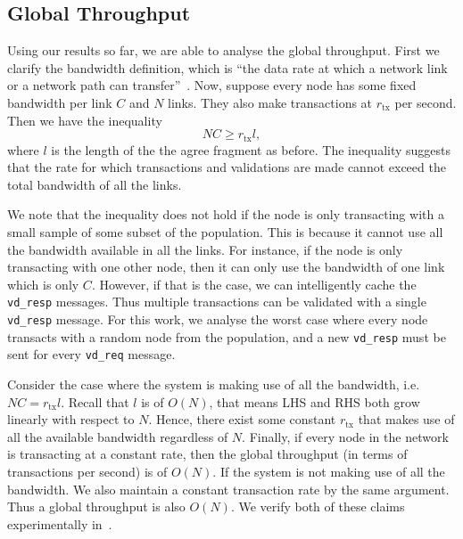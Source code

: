 \subsection{Global Throughput}
\label{sec:global-throughput}
Using our results so far, we are able to analyse the global throughput.
First we clarify the bandwidth definition, which is ``the data rate at which a network link or a network path can transfer''~\cite{prasad2003bandwidth}.
Now, suppose every node has some fixed bandwidth per link $C$ and $N$ links.
They also make transactions at $r_{\text{tx}}$ per second.
Then we have the inequality
$$NC \ge r_{\text{tx}} l,$$
where $l$ is the length of the the agree fragment as before.
The inequality suggests that the rate for which transactions and validations are made cannot exceed the total bandwidth of all the links.

We note that the inequality does not hold if the node is only transacting with a small sample of some subset of the population.
This is because it cannot use all the bandwidth available in all the links.
For instance, if the node is only transacting with one other node, then it can only use the bandwidth of one link which is only $C$.
However, if that is the case, we can intelligently cache the \texttt{vd\_resp} messages.
Thus multiple transactions can be validated with a single \texttt{vd\_resp} message.
For this work, we analyse the worst case where every node transacts with a random node from the population,
and a new \texttt{vd\_resp} must be sent for every \texttt{vd\_req} message.

Consider the case where the system is making use of all the bandwidth, i.e. $NC = r_{\text{tx}} l$.
Recall that $l$ is of $O(N)$, that means LHS and RHS both grow linearly with respect to $N$.
Hence, there exist some constant $r_\text{tx}$ that makes use of all the available bandwidth regardless of $N$.
Finally, if every node in the network is transacting at a constant rate, then the global throughput (in terms of transactions per second) is of $O(N)$.
If the system is not making use of all the bandwidth.
We also maintain a constant transaction rate by the same argument.
Thus a global throughput is also $O(N)$.
We verify both of these claims experimentally in~.


